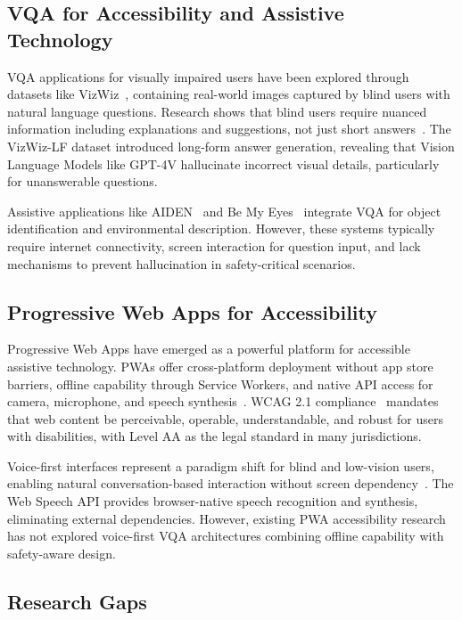 \documentclass[conference]{IEEEtran}
\begin{document}
\subsection{VQA for Accessibility and Assistive Technology}

VQA applications for visually impaired users have been explored through datasets like VizWiz~\cite{vizwiz_2024}, containing real-world images captured by blind users with natural language questions. Research shows that blind users require nuanced information including explanations and suggestions, not just short answers~\cite{vizwiz_lf_2024}. The VizWiz-LF dataset introduced long-form answer generation, revealing that Vision Language Models like GPT-4V hallucinate incorrect visual details, particularly for unanswerable questions.

Assistive applications like AIDEN~\cite{aiden_2024} and Be My Eyes~\cite{bemyeyes_2024} integrate VQA for object identification and environmental description. However, these systems typically require internet connectivity, screen interaction for question input, and lack mechanisms to prevent hallucination in safety-critical scenarios.

\subsection{Progressive Web Apps for Accessibility}

Progressive Web Apps have emerged as a powerful platform for accessible assistive technology. PWAs offer cross-platform deployment without app store barriers, offline capability through Service Workers, and native API access for camera, microphone, and speech synthesis~\cite{pwa_accessibility_2024}. WCAG 2.1 compliance~\cite{wcag_2018} mandates that web content be perceivable, operable, understandable, and robust for users with disabilities, with Level AA as the legal standard in many jurisdictions.

Voice-first interfaces represent a paradigm shift for blind and low-vision users, enabling natural conversation-based interaction without screen dependency~\cite{voice_first_2024}. The Web Speech API provides browser-native speech recognition and synthesis, eliminating external dependencies. However, existing PWA accessibility research has not explored voice-first VQA architectures combining offline capability with safety-aware design.

\subsection{Research Gaps}
\end{document}
